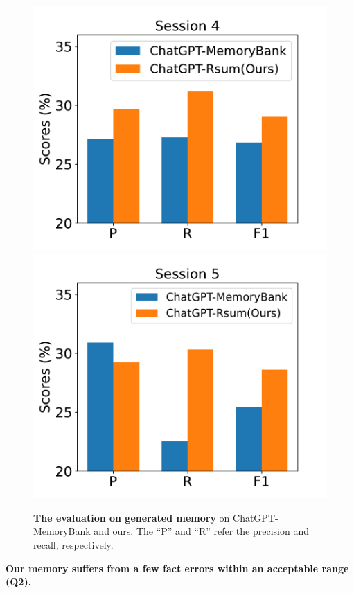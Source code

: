 \documentclass[authoryear,preprint,review,12pt]{elsarticle}
\begin{document}
 \begin{figure}[t]
  \centering
  \includegraphics[scale=0.4] {per_memory_sid4.pdf}
\includegraphics[scale=0.4] {per_memory_sid5.pdf}
  \caption{\textbf{The evaluation on generated memory} on ChatGPT-MemoryBank and ours. The ``P'' and ``R'' refer the precision and recall, respectively.}
  \label{fig:per_memory}
  \end{figure}



\textbf{Our memory suffers from a few fact errors within an acceptable range (Q2).}  
 
\end{document}
